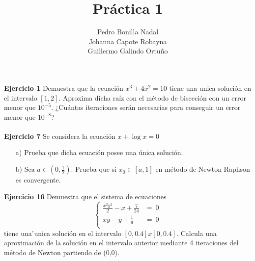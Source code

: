 \documentclass[11pt]{article}
\title{\textbf{Práctica 1}}
\author{Pedro Bonilla Nadal\\
		Johanna Capote Robayna\\
		Guillermo Galindo Ortuño}
\date{}
\begin{document}
\maketitle

\textbf{Ejercicio 1}
Demuestra que la ecuaci\'on $x^3 + 4x^2 = 10 $ tiene una unica soluci\'on en el intervalo $ [1,2] $. Aproxima dicha ra\'iz con el m\'etodo de bisecci\'on con un error menor que $10^{-5}$. ¿Cu\'antas iteraciones ser\'an necesarias para conseguir un error menor que $10^{-8}$?
\\
\\
\textbf{Ejercicio 7}
Se considera la ecuaci\'on $x + \log x = 0$
\begin{itemize}

\item[a)]Prueba que dicha ecuaci\'on posee una \'unica soluci\'on.
\item[b)] Sea $a \in (0, \frac{1}{2})$. Prueba que  si $x_0 \in [a,1]$ en m\'etodo de Newton-Raphson es convergente.

\end{itemize}
\textbf{Ejercicio 16}
Demuestra que el sistema de ecuaciones
$$\begin{cases}
\frac{x^2y^2}{2} - x + \frac{7}{24} &= \ 0 \\
xy - y + \frac{1}{9} &= \ 0\\
\end{cases}$$
tiene una  ́unica soluci\'on en el intervalo $[0, 0.4]x[0, 0.4]$. Calcula una aproximaci\'on de la soluci\'on en el intervalo anterior mediante 4 iteraciones del m\'etodo de Newton partiendo de (0,0).
\end{document}
